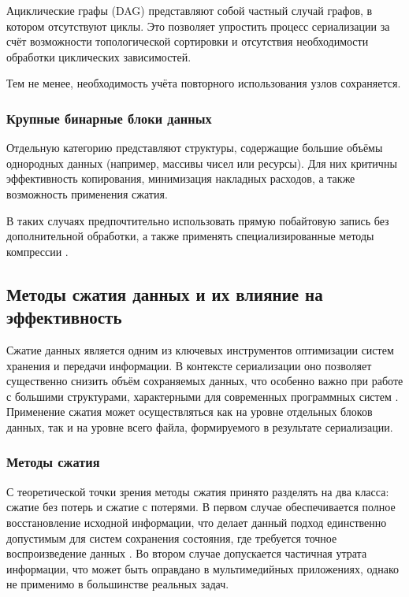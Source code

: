 \documentclass[coursework]{SCWorks}
\begin{document}
Ациклические графы (DAG) представляют собой частный случай графов, в котором отсутствуют циклы. Это позволяет упростить процесс сериализации за счёт возможности топологической сортировки и отсутствия необходимости обработки циклических зависимостей.

Тем не менее, необходимость учёта повторного использования узлов сохраняется.

\subsubsection{Крупные бинарные блоки данных}

Отдельную категорию представляют структуры, содержащие большие объёмы однородных данных (например, массивы чисел или ресурсы). Для них критичны эффективность копирования, минимизация накладных расходов, а также возможность применения сжатия.

В таких случаях предпочтительно использовать прямую побайтовую запись без дополнительной обработки, а также применять специализированные методы компрессии \cite{salomon2007data, sayood2017introduction}.


\subsection{Методы сжатия данных и их влияние на эффективность}

Сжатие данных является одним из ключевых инструментов оптимизации систем хранения и передачи информации. В контексте сериализации оно позволяет существенно снизить объём сохраняемых данных, что особенно важно при работе с большими структурами, характерными для современных программных систем \cite{kleppmann2017designing}. Применение сжатия может осуществляться как на уровне отдельных блоков данных, так и на уровне всего файла, формируемого в результате сериализации.

\subsubsection{Методы сжатия}
С теоретической точки зрения методы сжатия принято разделять на два класса: сжатие без потерь и сжатие с потерями. В первом случае обеспечивается полное восстановление исходной информации, что делает данный подход единственно допустимым для систем сохранения состояния, где требуется точное воспроизведение данных \cite{salomon2007data, sayood2017introduction}. Во втором случае допускается частичная утрата информации, что может быть оправдано в мультимедийных приложениях, однако не применимо в большинстве реальных задач.
\end{document}
